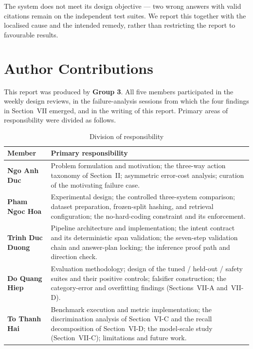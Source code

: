 \documentclass[conference]{IEEEtran}
\begin{document}
The system does not meet its design objective --- two wrong answers with valid
citations remain on the independent test suites. We report this together with the
localised cause and the intended remedy, rather than restricting the report to
favourable results.

\section*{Author Contributions}

This report was produced by \textbf{Group 3}. All five members participated in
the weekly design reviews, in the failure-analysis sessions from which the four
findings in Section~VII emerged, and in the writing of this report. Primary
areas of responsibility were divided as follows.

\begin{table}[h]
\caption{Division of responsibility}
\label{tab:contrib}
\centering
\footnotesize
\begin{tabular}{@{}lp{4.7cm}@{}}
\toprule
Member & Primary responsibility \\
\midrule
\textbf{Ngo Anh Duc}
  & Problem formulation and motivation; the three-way action taxonomy of
    Section~II; asymmetric error-cost analysis; curation of the motivating
    failure case. \\[2pt]
\textbf{Pham Ngoc Hoa}
  & Experimental design; the controlled three-system comparison; dataset
    preparation, frozen-split hashing, and retrieval configuration; the
    no-hard-coding constraint and its enforcement. \\[2pt]
\textbf{Trinh Duc Duong}
  & Pipeline architecture and implementation; the intent contract and its
    deterministic span validation; the seven-step validation chain and
    answer-plan locking; the inference proof path and direction check. \\[2pt]
\textbf{Do Quang Hiep}
  & Evaluation methodology; design of the tuned / held-out / safety suites and
    their positive controls; falsifier construction; the category-error and
    overfitting findings (Sections~VII-A and~VII-D). \\[2pt]
\textbf{To Thanh Hai}
  & Benchmark execution and metric implementation; the discrimination analysis
    of Section~VI-C and the recall decomposition of Section~VI-D; the
    model-scale study (Section~VII-C); limitations and future work. \\
\bottomrule
\end{tabular}
\end{table}
\end{document}
